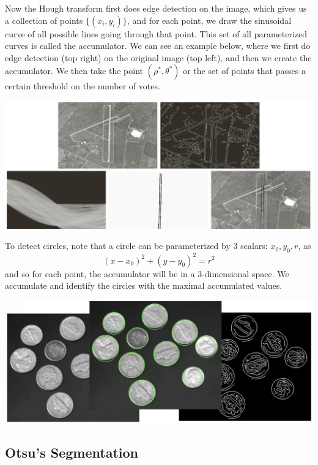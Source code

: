 \documentclass{article}
\begin{document}
    Now the Hough transform first does edge detection on the image, which gives us a collection of points $\{ (x_i, y_i)\}$, and for each point, we draw the sinusoidal curve of all possible lines going through that point. This set of all parameterized curves is called the accumulator. We can see an example below, where we first do edge detection (top right) on the original image (top left), and then we create the accumulator. We then take the point $(\rho^\ast, \theta^\ast)$ or the set of points that passes a certain threshold on the number of votes. 
    \begin{center}
        \includegraphics[scale=0.3]{img/accumulator.png}
    \end{center}

    To detect circles, note that a circle can be parameterized by 3 scalars: $x_0, y_0, r$, as 
    \[(x - x_0)^2 + (y - y_0)^2 = r^2\]
    and so for each point, the accumulator will be in a 3-dimensional space. We accumulate and identify the circles with the maximal accumulated values. 
    \begin{center}
        \includegraphics[scale=0.2]{img/circle_accum.png}
    \end{center}

  \subsection{Otsu's Segmentation}
\end{document}
